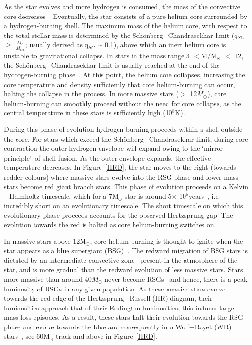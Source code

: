 \documentclass[a4paper,12pt]{article}
\begin{document}
As the star evolves and more hydrogen is consumed, the mass of the convective core decreases~\citep{b:KippenhahnWeigert}.
Eventually, the star consists of a pure helium core surrounded by a hydrogen-burning shell. 
The maximum mass of the helium core, with respect to the total stellar mass is determined by the Sch\"onberg$-$Chandrasekhar limit (q$_{SC}$ $\geq$ $\frac{M_{c}}{M_{tot}}$; usually derived as q$_{SC}$ $\sim$ 0.1), above which an inert helium core is unstable to gravitational collapse. 
In stars in the mass range 3 $<$M/M$_{\odot}$ $<$ 12, the Sch\"onberg$-$Chandrasekhar limit is usually reached at the end of the hydrogen-burning phase~\citep{b:SalarisCassisi05}.
At this point, the helium core collapses, increasing the core temperature and density sufficiently that core helium-burning can occur, halting the collapse in the process.
In more massive stars ($>$ 12$M_{\odot}$), core helium-burning can smoothly proceed without the need for core collapse, as the central temperature in these stars is sufficiently high (10$^{8}$K). 

During this phase of evolution hydrogen-burning proceeds within a shell outside the core. 
For stars which exceed the Sch\"onberg$-$Chandrasekhar limit, during core contraction the outer hydrogen envelope will expand owing to the \textquoteleft mirror principle\textquoteright ~of shell fusion.\footnotemark
{}
As the outer envelope expands, the effective temperature decreases.
In Figure~\ref{HRD}, the star moves to the right (towards redder colours) where massive stars evolve into the RSG phase and lower mass stars become red giant branch stars. 
This phase of evolution proceeds on a Kelvin$-$Helmholtz timescale, which for a 7M$_{\odot}$ star is around 5$\times$ 10$^{5}$years~\citep{b:KippenhahnWeigert}, i.e. incredibly short on an evolutionary timescale. 
The short timescale on which this evolutionary phase proceeds accounts for the observed Hertzsprung gap.
The evolution towards the red is halted as core helium-burning switches on.

In massive stars above 12M$_{\odot}$, core helium-burning is thought to ignite when the star appears as a blue supergiant (BSG)~\citep{Meynet11,Ekstrom12,Langer12,Saio13}.
The redward migration of BSG stars is dictated by an intermediate convective zone~\citep{Meynet11} present in the atmosphere of the star, and is more gradual than the redward evolution of less massive stars. 
Stars more massive than around 40$M_{\odot}$ never become RSGs~\citep{Massey03,Meynet11,Ekstrom12} and hence, there is a peak luminosity of RSGs in any given population.
As these massive stars evolve towards the red edge of the Hertzsprung$-$Russell (HR) diagram, their luminosities approach that of their Eddington luminosities; this induces large mass loss episodes.
As a result, these stars halt their evolution towards the RSG phase and evolve towards the blue and consequently into Wolf$-$Rayet (WR) stars~\citep{Crowther07, Vink09}, see 60M$_{\odot}$ track and above in Figure~\ref{HRD}.
\end{document}
